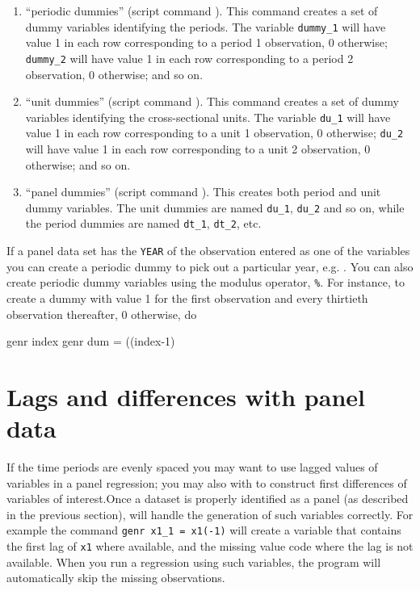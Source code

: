 \begin{enumerate}
\item ``periodic dummies'' (script command ).  This
  command creates a set of dummy variables identifying the periods.
  The variable \verb+dummy_1+ will have value 1 in each row
  corresponding to a period 1 observation, 0 otherwise; \verb+dummy_2+
  will have value 1 in each row corresponding to a period 2
  observation, 0 otherwise; and so on.
\item ``unit dummies'' (script command ).  This
  command creates a set of dummy variables identifying the
  cross-sectional units.  The variable \verb+du_1+ will have value 1
  in each row corresponding to a unit 1 observation, 0 otherwise;
  \verb+du_2+ will have value 1 in each row corresponding to a unit 2
  observation, 0 otherwise; and so on.
\item ``panel dummies'' (script command ).  This
  creates both period and unit dummy variables. The unit dummies are
  named \verb+du_1+, \verb+du_2+ and so on, while the period dummies
  are named \verb+dt_1+, \verb+dt_2+, etc.
\end{enumerate}

If a panel data set has the \verb+YEAR+ of the observation entered as
one of the variables you can create a periodic dummy to pick out a
particular year, e.g. .  You can also
create periodic dummy variables using the modulus operator,
\verb+%+.  For instance, to create a dummy with
value 1 for the first observation and every thirtieth observation
thereafter, 0 otherwise, do
\begin{code}
      genr index 
      genr dum = ((index-1)%
\end{code}

\section{Lags and differences with panel data}
\label{panel-lagged}

If the time periods are evenly spaced you may want to use lagged
values of variables in a panel regression; you may also with to
construct first differences of variables of interest.Once a dataset is
properly identified as a panel (as described in the previous section),
 will handle the generation of such variables correctly.
For example the command \verb+genr x1_1 = x1(-1)+ will create a
variable that contains the first lag of \verb+x1+ where available, and
the missing value code where the lag is not available.  When you run a
regression using such variables, the program will automatically skip
the missing observations.

